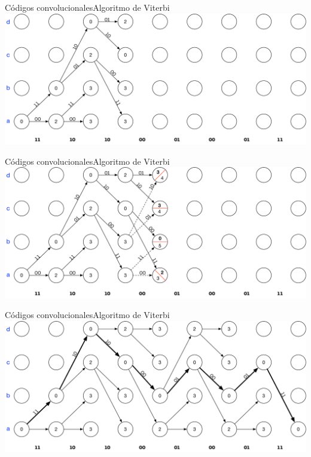 \documentclass[10pt,compress]{beamer} %
\begin{document}
\begin{frame}{Códigos convolucionales}{Algoritmo de Viterbi}
  \centering \includegraphics[width=0.8\linewidth]{../Apuntes/Figuras/Viterbi_3.pdf}
\end{frame}

\begin{frame}{Códigos convolucionales}{Algoritmo de Viterbi}
  \centering \includegraphics[width=0.8\linewidth]{../Apuntes/Figuras/Viterbi_4.pdf}
\end{frame}

\begin{frame}{Códigos convolucionales}{Algoritmo de Viterbi}
  \centering \includegraphics[width=0.8\linewidth]{../Apuntes/Figuras/Viterbi_5.pdf}
\end{frame}
\end{document}
